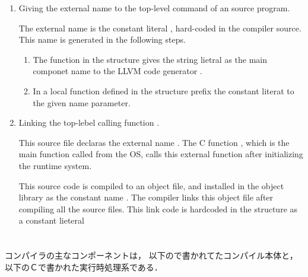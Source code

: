 \begin{enumerate}
\item Giving the external name to the top-level command of an
\smlsharp{} source program.

	The external name is the constant literal ,
hard-coded in the compiler source.
	This name is generated in the following steps.
\begin{enumerate}
\item The  function in the 
structure gives the string lietral  as
the main componet name to the LLVM code generator 
.
\item 
	In a local function  defined
in the  structure
prefix the constant literat  to the given name parameter.
\end{enumerate}

\item Linking the top-lebel calling function .

	This source file declaras the external name .
	The C function , which is the main function called
from the OS, calls this external function after initializing 
the \smlsharp{} runtime system.

	This source code is compiled to an object file, 
and installed in the \smlsharp{} object library as the constant name
.
	The \smlsharp{} compiler links this object file after compiling
all the source files.
	This link code is hardcoded in the
structure as a constant lieteral 
\end{enumerate}
\fi%

\section{}

\ifjp%
	\smlsharp{}コンパイラの主なコンポーネントは，
以下の\smlsharp{}で書かれてたコンパイル本体と，
以下のＣで書かれた実行時処理系である．
	
